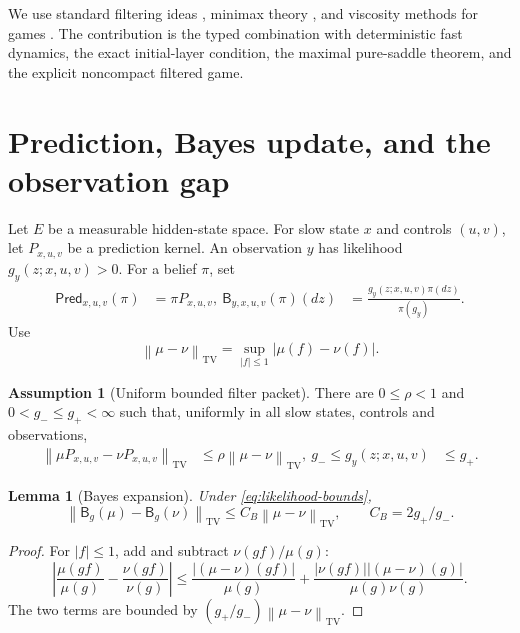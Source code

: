 \documentclass[11pt,reqno]{amsart}
\newtheorem{lemma}[theorem]{Lemma}
\theoremstyle{definition}
\newtheorem{assumption}[theorem]{Assumption}
\theoremstyle{remark}
\newcommand{\TV}{\mathrm{TV}}
\newcommand{\norm}[1]{\left\lVert #1\right\rVert}
\newcommand{\abs}[1]{\left\lvert #1\right\rvert}
\begin{document}
We use standard filtering ideas \cite{BainCrisan2009,AtarZeitouni1997,
vanHandel2009}, minimax theory \cite{Sion1958}, and viscosity methods for games
\cite{FlemingSouganidis1989,BuckdahnLi2008,FlemingSoner2006}.  The contribution
is the typed combination with deterministic fast dynamics, the exact
initial-layer condition, the maximal pure-saddle theorem, and the explicit
noncompact filtered game.

\section{Prediction, Bayes update, and the observation gap}\label{sec:filter}

Let $E$ be a measurable hidden-state space.  For slow state $x$ and controls
$(u,v)$, let $P_{x,u,v}$ be a prediction kernel.  An observation $y$ has
likelihood $g_y(z;x,u,v)>0$.  For a belief $\pi$, set
\begin{align}
 \mathsf{Pred}_{x,u,v}(\pi)&=\pi P_{x,u,v},\label{eq:pred}\
 \mathsf B_{y,x,u,v}(\pi)(dz)&=
 \frac{g_y(z;x,u,v)\pi(dz)}{\pi(g_y)}.
 \label{eq:Bayes}
\end{align}
Use
\[
 \norm{\mu-\nu}_{\TV}=
 \sup_{\abs f\le1}\abs{\mu(f)-\nu(f)}.
\]

\begin{assumption}[Uniform bounded filter packet]\label{ass:bounded-filter}
There are $0\le\rho<1$ and $0<g_-\le g_+<\infty$ such that, uniformly in all
slow states, controls and observations,
\begin{align}
 \norm{\mu P_{x,u,v}-\nu P_{x,u,v}}_{\TV}
 &\le\rho\norm{\mu-\nu}_{\TV},\label{eq:pred-contract}\
 g_-\le g_y(z;x,u,v)&\le g_+.
 \label{eq:likelihood-bounds}
\end{align}
\end{assumption}

\begin{lemma}[Bayes expansion]\label{lem:Bayes}
Under \eqref{eq:likelihood-bounds},
\[
 \norm{\mathsf B_g(\mu)-\mathsf B_g(\nu)}_{\TV}
 \le C_B\norm{\mu-\nu}_{\TV},
 \qquad C_B=2g_+/g_-.
\]
\end{lemma}

\begin{proof}
For $\abs f\le1$, add and subtract $\nu(gf)/\mu(g)$:
\[
 \abs{\frac{\mu(gf)}{\mu(g)}-
       \frac{\nu(gf)}{\nu(g)}}
 \le\frac{\abs{(\mu-\nu)(gf)}}{\mu(g)}
 +\frac{\abs{\nu(gf)}\abs{(\mu-\nu)(g)}}
       {\mu(g)\nu(g)}.
\]
The two terms are bounded by $(g_+/g_-)\norm{\mu-\nu}_{\TV}$.
\end{proof}
\end{document}
